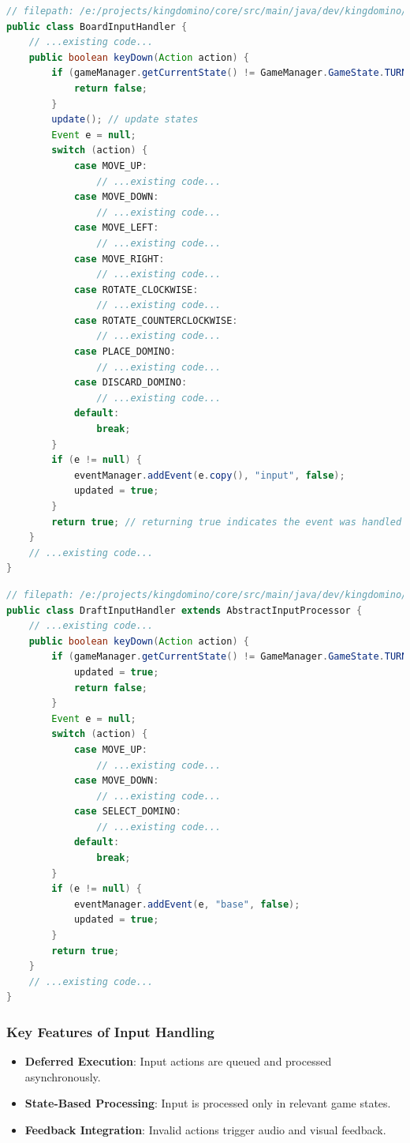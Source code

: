 \documentclass[conference]{IEEEtran}
\begin{document}
\begin{lstlisting}[language=Java]
// filepath: /e:/projects/kingdomino/core/src/main/java/dev/kingdomino/game/BoardInputHandler.java
public class BoardInputHandler {
    // ...existing code...
    public boolean keyDown(Action action) {
        if (gameManager.getCurrentState() != GameManager.GameState.TURN_PLACING) {
            return false;
        }
        update(); // update states
        Event e = null;
        switch (action) {
            case MOVE_UP:
                // ...existing code...
            case MOVE_DOWN:
                // ...existing code...
            case MOVE_LEFT:
                // ...existing code...
            case MOVE_RIGHT:
                // ...existing code...
            case ROTATE_CLOCKWISE:
                // ...existing code...
            case ROTATE_COUNTERCLOCKWISE:
                // ...existing code...
            case PLACE_DOMINO:
                // ...existing code...
            case DISCARD_DOMINO:
                // ...existing code...
            default:
                break;
        }
        if (e != null) {
            eventManager.addEvent(e.copy(), "input", false);
            updated = true;
        }
        return true; // returning true indicates the event was handled
    }
    // ...existing code...
}
\end{lstlisting}

\begin{lstlisting}[language=Java]
// filepath: /e:/projects/kingdomino/core/src/main/java/dev/kingdomino/game/DraftInputHandler.java
public class DraftInputHandler extends AbstractInputProcessor {
    // ...existing code...
    public boolean keyDown(Action action) {
        if (gameManager.getCurrentState() != GameManager.GameState.TURN_CHOOSING) {
            updated = true;
            return false;
        }
        Event e = null;
        switch (action) {
            case MOVE_UP:
                // ...existing code...
            case MOVE_DOWN:
                // ...existing code...
            case SELECT_DOMINO:
                // ...existing code...
            default:
                break;
        }
        if (e != null) {
            eventManager.addEvent(e, "base", false);
            updated = true;
        }
        return true;
    }
    // ...existing code...
}
\end{lstlisting}

\subsubsection{Key Features of Input Handling}
\begin{itemize}
    \item \textbf{Deferred Execution}: Input actions are queued and processed asynchronously.
    \item \textbf{State-Based Processing}: Input is processed only in relevant game states.
    \item \textbf{Feedback Integration}: Invalid actions trigger audio and visual feedback.
\end{itemize}
\end{document}
